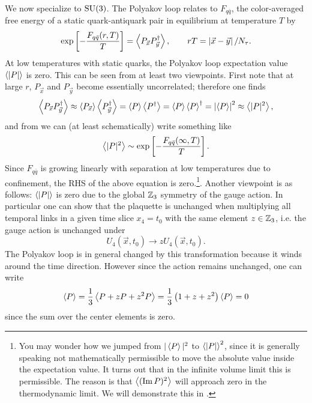 We now specialize to $\operatorname{SU}(3)$. The Polyakov loop relates to $F_{q\bar{q}}$,
the color-averaged free energy of a static quark-antiquark pair in
equilibrium at temperature $T$ by
\cite{mclerran_monte_1981,mclerran_quark_1981}
\begin{equation}\label{eq:Fav}
  \exp\left[-\frac{F_{q\bar{q}}(r,T)}{T}\right] 
    =\ev{P_{\vec{x}}P^\dagger_{\vec{y}}},
     \qquad rT=\left|\vec{x}-\vec{y}\tinysp\right|/N_\tau.
\end{equation}
At low temperatures with static quarks, the Polyakov loop expectation value
$\ev{|P|}$ is zero. This can be seen from at least two viewpoints. First
note that at large $r$, $P_{\vec{x}}$ and $P_{\vec{y}}$ become essentially
uncorrelated; therefore one finds
\begin{equation}\label{eq:ploop_decouple}
  \ev{P_{\vec{x}}P^\dagger_{\vec{y}}}
    \approx\ev{P_{\vec{x}}}\ev{P^\dagger_{\vec{y}}}
    =\ev{P}\ev{P^\dagger}
    =\ev{P}\ev{P}^\dagger
    =\left|\ev{P}\right|^2
    \approx\ev{|P|^2},
\end{equation}
and from  we can (at least schematically) write
something like
\begin{equation}
  \ev{|P|^2}\sim\exp\left[-\frac{F_{q\bar{q}}(\infty,T)}{T}\right]. 
\end{equation}
Since $F_{q\bar{q}}$ is growing linearly with separation at low temperatures
due to confinement, the RHS of the above equation is zero.\footnote{You may
wonder how we jumped from $|\ev{P}|^2$ to $\ev{|P|}^2$, since it is generally
speaking not mathematically permissible to move the absolute value inside the
expectation value. It turns out that in the infinite volume limit this is
permissible. The reason is that $\ev{(\Im P)^2}$
will approach zero in the thermodynamic limit. We
will demonstrate this in .}.
Another viewpoint is as follows: $\ev{|P|}$ is zero due to the global
$\mathbb{Z}_3$ symmetry of the gauge action. In particular one can show
that the plaquette is unchanged when multiplying all temporal links in a
given time slice $x_4=t_0$ with the same element $z\in\mathbb{Z}_3$, i.e.
the gauge action is unchanged under
\begin{equation}
  U_4(\vec{x},t_0)\to zU_4(\vec{x},t_0).
\end{equation}
The Polyakov loop is in general changed by this transformation
because it winds around the time direction. However since the action remains
unchanged, one can write
\begin{equation}\label{eq:centerzero}
  \ev{P}=\frac{1}{3}\ev{P+zP+z^2P}=\frac{1}{3}\left(1+z+z^2\right)\ev{P}=0
\end{equation}
since the sum over the center elements is zero.

